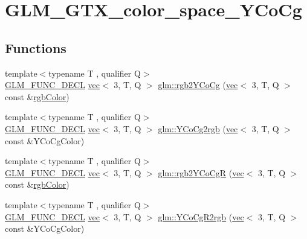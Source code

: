 \hypertarget{group__gtx__color__space___y_co_cg}{}\section{G\+L\+M\+\_\+\+G\+T\+X\+\_\+color\+\_\+space\+\_\+\+Y\+Co\+Cg}
\label{group__gtx__color__space___y_co_cg}
\subsection*{Functions}
\begin{DoxyCompactItemize}
\item 
{\footnotesize template$<$typename T , qualifier Q$>$ }\\\mbox{\hyperlink{setup_8hpp_ab2d052de21a70539923e9bcbf6e83a51}{G\+L\+M\+\_\+\+F\+U\+N\+C\+\_\+\+D\+E\+CL}} \mbox{\hyperlink{structglm_1_1vec}{vec}}$<$ 3, T, Q $>$ \mbox{\hyperlink{group__gtx__color__space___y_co_cg_ga0606353ec2a9b9eaa84f1b02ec391bc5}{glm\+::rgb2\+Y\+Co\+Cg}} (\mbox{\hyperlink{structglm_1_1vec}{vec}}$<$ 3, T, Q $>$ const \&\mbox{\hyperlink{group__gtx__color__space_ga5f9193be46f45f0655c05a0cdca006db}{rgb\+Color}})
\item 
{\footnotesize template$<$typename T , qualifier Q$>$ }\\\mbox{\hyperlink{setup_8hpp_ab2d052de21a70539923e9bcbf6e83a51}{G\+L\+M\+\_\+\+F\+U\+N\+C\+\_\+\+D\+E\+CL}} \mbox{\hyperlink{structglm_1_1vec}{vec}}$<$ 3, T, Q $>$ \mbox{\hyperlink{group__gtx__color__space___y_co_cg_ga163596b804c7241810b2534a99eb1343}{glm\+::\+Y\+Co\+Cg2rgb}} (\mbox{\hyperlink{structglm_1_1vec}{vec}}$<$ 3, T, Q $>$ const \&Y\+Co\+Cg\+Color)
\item 
{\footnotesize template$<$typename T , qualifier Q$>$ }\\\mbox{\hyperlink{setup_8hpp_ab2d052de21a70539923e9bcbf6e83a51}{G\+L\+M\+\_\+\+F\+U\+N\+C\+\_\+\+D\+E\+CL}} \mbox{\hyperlink{structglm_1_1vec}{vec}}$<$ 3, T, Q $>$ \mbox{\hyperlink{group__gtx__color__space___y_co_cg_ga0389772e44ca0fd2ba4a79bdd8efe898}{glm\+::rgb2\+Y\+Co\+CgR}} (\mbox{\hyperlink{structglm_1_1vec}{vec}}$<$ 3, T, Q $>$ const \&\mbox{\hyperlink{group__gtx__color__space_ga5f9193be46f45f0655c05a0cdca006db}{rgb\+Color}})
\item 
{\footnotesize template$<$typename T , qualifier Q$>$ }\\\mbox{\hyperlink{setup_8hpp_ab2d052de21a70539923e9bcbf6e83a51}{G\+L\+M\+\_\+\+F\+U\+N\+C\+\_\+\+D\+E\+CL}} \mbox{\hyperlink{structglm_1_1vec}{vec}}$<$ 3, T, Q $>$ \mbox{\hyperlink{group__gtx__color__space___y_co_cg_gaf8d30574c8576838097d8e20c295384a}{glm\+::\+Y\+Co\+Cg\+R2rgb}} (\mbox{\hyperlink{structglm_1_1vec}{vec}}$<$ 3, T, Q $>$ const \&Y\+Co\+Cg\+Color)
\end{DoxyCompactItemize}


